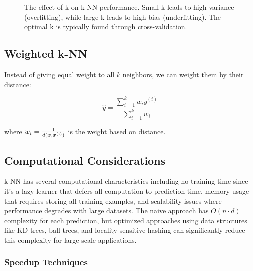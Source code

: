 \begin{figure}[htbp]
\centering
{}
\caption{The effect of k on k-NN performance. Small k leads to high variance (overfitting), while large k leads to high bias (underfitting). The optimal k is typically found through cross-validation.}
\label{fig:knn-k-selection}
\end{figure}

\subsection{Weighted k-NN}

Instead of giving equal weight to all $k$ neighbors, we can weight them by their distance:

\begin{equation}
\hat{y} = \frac{\sum_{i=1}^{k} w_i y^{(i)}}{\sum_{i=1}^{k} w_i}
\end{equation}

where $w_i = \frac{1}{d(\boldsymbol{x}, \boldsymbol{x}^{(i)})}$ is the weight based on distance.

\subsection{Computational Considerations}

k-NN has several computational characteristics including no training time since it's a lazy learner that defers all computation to prediction time, memory usage that requires storing all training examples, and scalability issues where performance degrades with large datasets. The naive approach has $O(n \cdot d)$ complexity for each prediction, but optimized approaches using data structures like KD-trees, ball trees, and locality sensitive hashing can significantly reduce this complexity for large-scale applications.

\subsubsection{Speedup Techniques}

